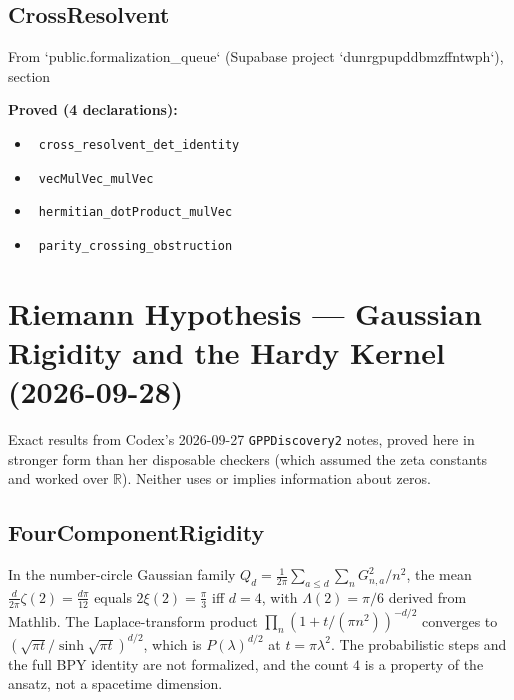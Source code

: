 \documentclass{report}
\theoremstyle{definition}
\begin{document}
\subsection{CrossResolvent}
From `public.formalization\_queue` (Supabase project `dunrgpupddbmzffntwph`), section

\noindent\textbf{Proved (4 declarations):}
\begin{itemize}
  \item {}\leanok\ \texttt{cross\_resolvent\_det\_identity}
  \item {}\leanok\ \texttt{vecMulVec\_mulVec}
  \item {}\leanok\ \texttt{hermitian\_dotProduct\_mulVec}
  \item {}\leanok\ \texttt{parity\_crossing\_obstruction}
\end{itemize}

\section{Riemann Hypothesis --- Gaussian Rigidity and the Hardy Kernel (2026-09-28)}
Exact results from Codex's 2026-09-27 \texttt{GPPDiscovery2} notes, proved here in stronger form than her disposable checkers (which assumed the zeta constants and worked over $\mathbb{R}$). Neither uses or implies information about zeros.

\subsection{FourComponentRigidity}
In the number-circle Gaussian family $Q_d=\frac1{2\pi}\sum_{a\le d}\sum_{n}G_{n,a}^2/n^2$, the mean $\frac{d}{2\pi}\zeta(2)=\frac{d\pi}{12}$ equals $2\xi(2)=\frac{\pi}{3}$ iff $d=4$, with $\Lambda(2)=\pi/6$ derived from Mathlib. The Laplace-transform product $\prod_n(1+t/(\pi n^2))^{-d/2}$ converges to $(\sqrt{\pi t}/\sinh\sqrt{\pi t})^{d/2}$, which is $P(\lambda)^{d/2}$ at $t=\pi\lambda^2$. The probabilistic steps and the full BPY identity are not formalized, and the count $4$ is a property of the ansatz, not a spacetime dimension.
\end{document}
